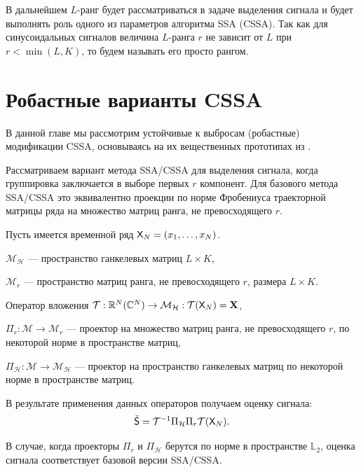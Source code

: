 \documentclass[specialist,
               substylefile = spbu.rtx,
               subf,href,colorlinks=true, 12pt]{disser}
\begin{document}
В дальнейшем $L$-ранг будет рассматриваться в задаче выделения сигнала и будет выполнять роль одного из параметров алгоритма SSA (CSSA). Так как для синусоидальных сигналов величина $L$-ранга $r$ не зависит от $L$ при $r<\min(L,K)$, то будем называть его просто рангом.

\chapter{Робастные варианты CSSA}
\label{ch:ssa_outliers}
В данной главе мы рассмотрим устойчивые к выбросам (робастные) модификации CSSA, основываясь на их вещественных прототипах из \cite{Tretyakova20}.


Рассматриваем вариант метода SSA/CSSA для выделения сигнала, когда группировка заключается в выборе первых $r$ компонент. Для базового метода SSA/CSSA это эквивалентно проекции по норме Фробениуса траекторной матрицы ряда на множество матриц ранга, не превосходящего $r$.

Пусть имеется временной ряд $\textsf{X}_N=(x_1, \ldots, x_{N})$.

$\mathcal{M}_{\mathcal{H}}$ --- пространство ганкелевых матриц $L\times K$,

$\mathcal{M}_{r}$ --- пространство матриц ранга, не превосходящего $r$, размера $L \times K$.

Оператор вложения $\mathcal{T}:\mathbb{R}^N(\mathbb{C}^N) \rightarrow \mathcal{M}_{\mathcal{H}}: \mathcal{T} (\textsf{X}_N) = \mathbf{X} $,

$\Pi_{r}:\mathcal{M}\rightarrow \mathcal{M}_r$ --- проектор на множество матриц ранга, не превосходящего $r$, по некоторой норме в пространстве матриц,

$\Pi_{\mathcal{H}}:\mathcal{M} \rightarrow \mathcal{M}_{\mathcal{H}}$ --- проектор на пространство ганкелевых матриц по некоторой норме в пространстве матриц.

В результате применения данных операторов получаем оценку сигнала:
\begin{equation*}
	\tilde{\textsf{S}} = \mathcal{T}^{-1} \Pi_{\mathcal{H}} \Pi_{r} \mathcal{T} (\textsf{X}_N).
\end{equation*}

В случае, когда проекторы $\Pi_r$ и $\Pi_{\mathcal{H}}$ берутся по норме в пространстве $\mathbb{L}_2$, оценка сигнала соответствует базовой версии SSA/CSSA.
\end{document}
